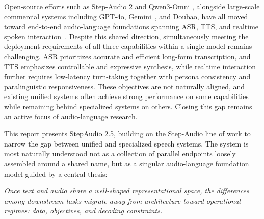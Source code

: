 Open-source efforts such as Step-Audio 2 \citep{wu2025stepaudio2technicalreport} and Qwen3-Omni \citep{xu2025qwen3omnitechnicalreport}, alongside large-scale commercial systems including GPT-4o, Gemini~\citep{team2023gemini}, and Doubao, have all moved toward end-to-end audio-language foundations spanning ASR, TTS, and realtime spoken interaction~\citep{yan2025step,wu2025mind,wu2025chronological,zhang2026sla,cui2025recent,zhang2025mamba,liu2026code}. Despite this shared direction, simultaneously meeting the deployment requirements of all three capabilities within a single model remains challenging. ASR prioritizes accurate and efficient long-form transcription, and TTS emphasizes controllable and expressive synthesis, while realtime interaction further requires low-latency turn-taking together with persona consistency and paralinguistic responsiveness. These objectives are not naturally aligned, and existing unified systems often achieve strong performance on some capabilities while remaining behind specialized systems on others. Closing this gap remains an active focus of audio-language research.

This report presents StepAudio 2.5, building on the Step-Audio line of work \citep{wu2025stepaudio2technicalreport, tian2025step, zhang2026step} to narrow the gap between unified and specialized speech systems. The system is most naturally understood not as a collection of parallel endpoints loosely assembled around a shared name, but as a singular audio-language foundation model guided by a central thesis:

\begin{tcolorbox}[colback=gray!10, colframe=gray!10, boxrule=0pt, arc=2mm, halign=center]
\textit{Once text and audio share a well-shaped representational space, the differences among downstream tasks migrate away from architecture toward operational regimes: data, objectives, and decoding constraints.}
\end{tcolorbox}

